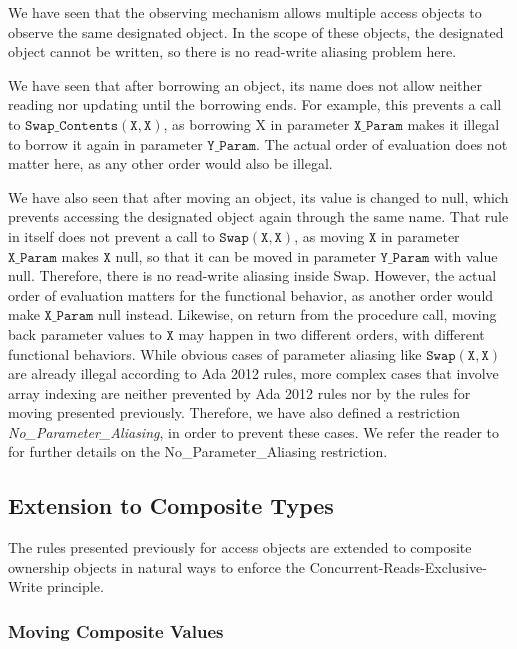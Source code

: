 \documentclass{llncs}
\newcommand\var[1]{\ensuremath{\mathtt{#1}}}
\begin{document}
We have seen that the observing mechanism allows multiple access objects to observe the same designated object. In the scope of these objects, the designated object
cannot be written, so there is no read-write aliasing problem here.

We have seen that after borrowing an object, its name does not allow neither reading nor updating until the borrowing ends. For example, this prevents a call to \var{Swap\_Contents (X, X)},
as borrowing X in parameter \var{X\_Param} makes it illegal to borrow it again in parameter \var{Y\_Param}. The actual order of evaluation does not matter here, as any other order would also be illegal.

We have also seen that after moving an object, its value is changed to null, which prevents accessing the designated object again through the same name.
That rule in itself does not prevent a call to \var{Swap(X, X)}, as moving \var{X} in parameter \var{X\_Param} makes \var{X} null, so that it can be moved in parameter \var{Y\_Param} with value null.
Therefore, there is no read-write aliasing inside Swap. However, the actual order of evaluation matters for the functional behavior, as another order would make \var{X\_Param} null
instead. Likewise, on return from the procedure call, moving back parameter values to \var{X} may happen in two different orders, with different functional behaviors.
While obvious cases of parameter aliasing like \var{Swap(X,X)} are already illegal according to Ada 2012 rules, more complex cases that involve array indexing are neither
prevented by Ada 2012 rules nor by the rules for moving presented previously. Therefore, we have also defined a restriction \textit{No\_Parameter\_Aliasing},
in order to prevent these cases. We refer the reader to \cite{AI2017} for further details on the No\_Parameter\_Aliasing restriction.


\subsection{Extension to Composite Types} 
\label{subsec:ownershipComposite}

The rules presented previously for access objects are extended to composite ownership objects in natural ways to enforce the Concurrent-Reads-Exclusive-Write principle. 

\subsubsection{Moving Composite Values}
\label{subsubsec:movingComposite}
\end{document}
